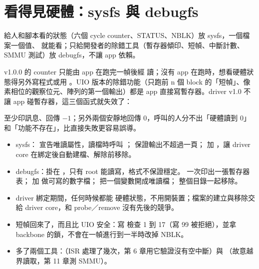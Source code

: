 \section{看得見硬體：sysfs 與 debugfs}
\label{sec:observe}

\begin{oneline}
給人和腳本看的狀態（六個 cycle counter、STATUS、NBLK）放 sysfs，一個檔案一個值、 就能看；只給開發者的除錯工具（暫存器傾印、短幀、中斷計數、SMMU 測試）放 debugfs，不讓 app 依賴。
\end{oneline}

\begin{before}
v1.0.0 的 counter 只能由 app 在跑完一幀後經  讀；沒有 app 在跑時，想看硬體狀態得另外寫程式或用 。UIO 版本的除錯功能（只跑前 n 個 block 的「短幀」、像素相位的觀察位元、陣列的第一個輸出）都是 app 直接寫暫存器。driver v1.0 不讓 app 碰暫存器，這三個函式就失效了：


 至少印訊息、回傳 $-1$；另外兩個安靜地回傳 0，呼叫的人分不出「硬體讀到 0」和「功能不存在」，比直接失敗更容易誤導。
\end{before}

\begin{tech}
\begin{itemize}
\item sysfs： 宣告唯讀屬性，讀檔時呼叫 ； 保證輸出不超過一頁； 加 ，讓 driver core 在綁定後自動建檔、解除前移除。
\item debugfs：掛在 ，只有 root 能讀寫，格式不保證穩定。 一次印出一張暫存器表； 加  做可寫的數字檔； 把一個變數開成唯讀檔； 整個目錄一起移除。
\end{itemize}
\end{tech}

\begin{gain}
\begin{itemize}
\item driver 綁定期間，任何時候都能  硬體狀態，不用開裝置；檔案的建立與移除交給 driver core，和 probe／remove 沒有先後的競爭。
\item 短幀回來了，而且比 UIO 安全：寫  檢查 1 到 17（寫 99 被拒絕），並拿 backbone 的鎖，不會在一幀進行到一半時改掉 NBLK。
\item 多了兩個工具：（ISR 處理了幾次，第 6 章用它驗證沒有空中斷）與 （故意越界讀取，第 11 章測 SMMU）。
\end{itemize}
\end{gain}

